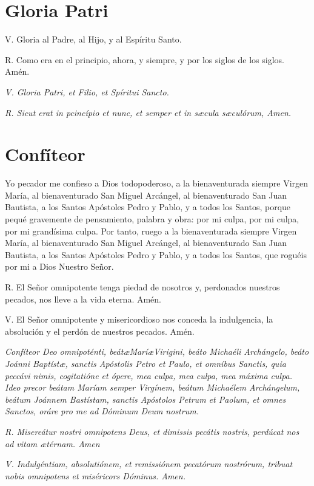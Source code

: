 \documentclass[a4paper,11pt, oneside]{report}
\begin{document}
\section*{Gloria Patri}
  {
    V. Gloria al Padre, al Hijo, y al Espíritu Santo.\par
    \indent R. Como era en el principio, ahora, y siempre, y por los siglos de los siglos. Amén.

    \medskip

    \textit{V. Gloria Patri, et Filio, et Spíritui Sancto.}\par
    \indent \textit{R. Sicut erat in pcincípio et nunc, et semper et in s{\ae}cula s{\ae}culórum, Amen.}
  }

\section*{Confíteor}\label{sec:confiteor}
  {
    Yo pecador me confieso a Dios todopoderoso, a la bienaventurada siempre Virgen María, al bienaventurado San Miguel Arcángel,
    al bienaventurado San Juan Bautista, a los Santos Apóstoles Pedro y Pablo, y a todos los Santos, porque pequé gravemente de 
    pensamiento, palabra y obra: por mi culpa, por mi culpa, por mi grandísima culpa. Por tanto, ruego a la bienaventurada siempre
    Virgen María, al bienaventurado San Miguel Arcángel, al bienaventurado San Juan Bautista, a los Santos Apóstoles Pedro y Pablo,
    y a todos los Santos, que roguéis por mi a Dios Nuestro Señor.\par\smallbreak{}
    R. El Señor omnipotente tenga piedad de nosotros y, perdonados nuestros pecados, nos lleve a la vida eterna. Amén.\par\smallbreak{}
    V. El Señor omnipotente y misericordioso nos conceda la indulgencia, la absolución y el perdón de nuestros pecados. Amén.

    \medskip

    \textit{Confíteor Deo omnipoténti, beát\ae Marí\ae Virigini, beáto Michaéli Archángelo, beáto Joánni Baptíst\ae, sanctis Apóstolis
    Petro et Paulo, et omníbus Sanctis, quia peccávi nimis, cogitatióne et ópere, mea culpa, mea culpa, mea máxima culpa. Ideo precor
    beátam Maríam semper Virgínem, beátum Michaélem Archángelum, beátum Joánnem Bastístam, sanctis Apóstolos Petrum et Paolum, et omnes
    Sanctos, oráre pro me ad Dóminum Deum nostrum.}\par\smallbreak{}
    \textit{R. Misereátur nostri omnipotens Deus, et dimissis pecátis nostris, perdúcat nos ad vitam {\ae}térnam. Amen}\par\smallbreak{}
    \textit{V. Indulgéntiam, absolutiónem, et remissiónem pecatórum nostrórum, tribuat nobis omnipotens et miséricors Dóminus. Amen.}
  }
\end{document}

